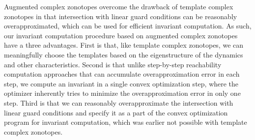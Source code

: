 Augmented complex zonotopes overcome the drawback of template complex
zonotopes in that intersection with linear guard conditions can be
reasonably overapproximated, which can be used for efficient invariant
computation.  As such, our invariant computation procedure based on
augmented complex zonotopes have a three advantages.  First is that,
like template complex zonotopes, we can meaningfully choose the
templates based on the eigenstructure of the dynamics and other
characteristics.  Second is that unlike step-by-step reachability
computation approaches that can accumulate overapproximation error in
each step, we compute an invariant in a single convex optimization
step, where the optimizer inherently tries to minimize the
overapproximation error in only one step.  Third is that we can
reasonably overapproximate the intersection with linear guard
conditions and specify it as a part of the convex optimization program
for invariant computation, which was earlier not possible with
template complex zonotopes.

